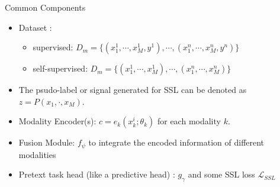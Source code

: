 \documentclass[serif, aspectratio=169]{beamer}
\begin{document}
\begin{frame}{Common Components}
    \begin{itemize}
        \item Dataset :
\begin{itemize}
\item supervised:  $D_m = \{ (x_1^1, \cdots, x_M^1, y^1), \cdots, (x_1^n, \cdots, x_M^n, y^n)  \}$
\item self-supervised:  $D_m = \{ (x_1^1, \cdots, x_M^1), \cdots, (x_1^n, \cdots, x_M^n)  \}$
\end{itemize}
\item The psudo-label or signal generated for SSL can be denoted as $z = P(x_1,\cdot,x_M)$.

        \item Modality Encoder(s): $c = e_k(x_k^i; \theta_k)$ for each modality $k$.
	\item Fusion Module: $f_\psi$ to integrate the encoded information of different modalities
	\item Pretext task head (like a predictive head) : $g_\gamma$ and some SSL loss $\mathcal{L}_{SSL}$

    \end{itemize}
\end{frame}
\end{document}
